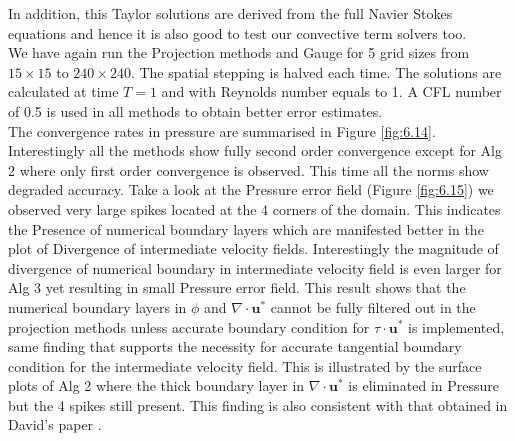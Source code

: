 In addition, this Taylor solutions are derived from the full Navier Stokes equations and hence it is also good to test our convective term solvers too.\\

We have again run the Projection methods and Gauge for 5 grid sizes from $15 \times 15$ to $240 \times 240$. The spatial stepping is halved each time. The solutions are calculated at time $T=1$ and with Reynolds number equals to 1. A CFL number of 0.5 is used in all methods to obtain better error estimates.\\

The convergence rates in pressure are summarised in Figure \ref{fig:6.14}. Interestingly all the methods show fully second order convergence except for Alg 2 where only first order convergence is observed. This time all the norms show degraded accuracy. Take a look at the Pressure error field (Figure \ref{fig:6.15}) we observed very large spikes located at the 4 corners of the domain. This indicates the Presence of numerical boundary layers which are manifested better in the plot of Divergence of intermediate velocity fields. Interestingly the magnitude of divergence of numerical boundary in intermediate velocity field is even larger for Alg 3 yet resulting in small Pressure error field. This result shows that the numerical boundary layers in $\phi$ and $\nabla \cdot \textbf{u}^*$ cannot be fully filtered out in the projection methods unless accurate boundary condition for $\textbf{$\tau$} \cdot \textbf{u}^*$ is implemented, same finding that supports the necessity for accurate tangential boundary condition for the intermediate velocity field. This is illustrated by the surface plots of Alg 2 where the thick boundary layer in $\nabla \cdot \textbf{u}^*$ is eliminated in Pressure but the 4 spikes still present. This finding is also consistent with that obtained in David's paper \cite{brown2001accurate}.\\

